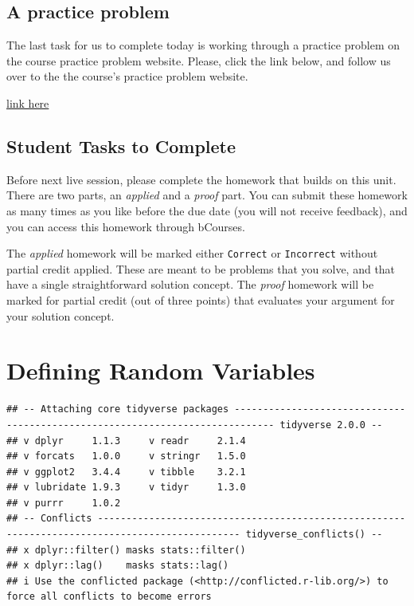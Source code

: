 \documentclass[
]{book}
\theoremstyle{definition}
\theoremstyle{definition}
\theoremstyle{definition}
\theoremstyle{definition}
\theoremstyle{remark}
\begin{document}
\hypertarget{a-practice-problem}{%
\section{A practice problem}\label{a-practice-problem}}

The last task for us to complete today is working through a practice problem on the course practice problem website. Please, click the link below, and follow us over to the the course's practice problem website.

\href{https://mids-w203.github.io/practice_problems/}{link here}

\hypertarget{student-tasks-to-complete}{%
\section{Student Tasks to Complete}\label{student-tasks-to-complete}}

Before next live session, please complete the homework that builds on this unit. There are two parts, an \emph{applied} and a \emph{proof} part. You can submit these homework as many times as you like before the due date (you will not receive feedback), and you can access this homework through bCourses.

The \emph{applied} homework will be marked either \texttt{Correct} or \texttt{Incorrect} without partial credit applied. These are meant to be problems that you solve, and that have a single straightforward solution concept. The \emph{proof} homework will be marked for partial credit (out of three points) that evaluates your argument for your solution concept.

\hypertarget{defining-random-variables}{%
\chapter{Defining Random Variables}\label{defining-random-variables}}

\begin{verbatim}
## -- Attaching core tidyverse packages ----------------------------------------------------------------------------- tidyverse 2.0.0 --
## v dplyr     1.1.3     v readr     2.1.4
## v forcats   1.0.0     v stringr   1.5.0
## v ggplot2   3.4.4     v tibble    3.2.1
## v lubridate 1.9.3     v tidyr     1.3.0
## v purrr     1.0.2     
## -- Conflicts ----------------------------------------------------------------------------------------------- tidyverse_conflicts() --
## x dplyr::filter() masks stats::filter()
## x dplyr::lag()    masks stats::lag()
## i Use the conflicted package (<http://conflicted.r-lib.org/>) to force all conflicts to become errors
\end{verbatim}
\end{document}
